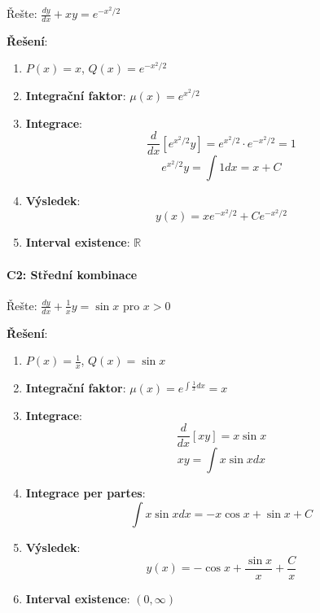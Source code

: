 \vspace{0.6\baselineskip}

\begin{example}
Řešte: $\frac{dy}{dx} + xy = e^{-x^2/2}$
\vspace{0.3\baselineskip}

\textbf{Řešení}: 
\begin{enumerate}
\item $P(x) = x$, $Q(x) = e^{-x^2/2}$

\item \textbf{Integrační faktor}: $\mu(x) = e^{x^2/2}$

\item \textbf{Integrace}:
\[
\frac{d}{dx}[e^{x^2/2}y] = e^{x^2/2} \cdot e^{-x^2/2} = 1
\]
\[
e^{x^2/2}y = \int 1  dx = x + C
\]

\item \textbf{Výsledek}:
\[
y(x) = xe^{-x^2/2} + Ce^{-x^2/2}
\]

\item \textbf{Interval existence}: $\mathbb{R}$
\end{enumerate}
\end{example}

\vspace{0.8\baselineskip}

\paragraph*{C2: Střední kombinace}

\begin{example}
Řešte: $\frac{dy}{dx} + \frac{1}{x}y = \sin x$ pro $x > 0$
\vspace{0.3\baselineskip}

\textbf{Řešení}: 
\begin{enumerate}
\item $P(x) = \frac{1}{x}$, $Q(x) = \sin x$

\item \textbf{Integrační faktor}: $\mu(x) = e^{\int \frac{1}{x}dx} = x$

\item \textbf{Integrace}:
\[
\frac{d}{dx}[xy] = x\sin x
\]
\[
xy = \int x\sin x  dx
\]

\item \textbf{Integrace per partes}:
\[
\int x\sin x  dx = -x\cos x + \sin x + C
\]

\item \textbf{Výsledek}:
\[
y(x) = -\cos x + \frac{\sin x}{x} + \frac{C}{x}
\]

\item \textbf{Interval existence}: $(0, \infty)$
\end{enumerate}
\end{example}

